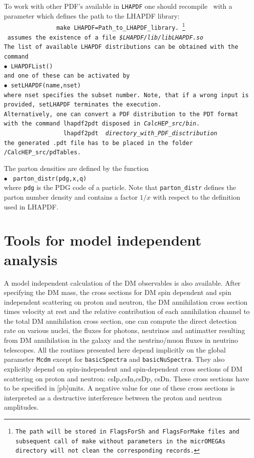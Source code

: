 \documentclass[12pt,a4paper]{article}
\begin{document}
To work with other PDF's available in {\tt LHAPDF}  one should 
 recompile \micro\ with a parameter which defines the  path to the LHAPDF library:\\
\verb|               make LHAPDF=|{\tt Path\_to\_LHAPDF\_library. \footnote{The path will be stored in {\tt FlagsForSh} and 
{\tt FlagsForMake} files and subsequent call of {\tt make} without parameters  in the {\tt micrOMEGAs} directory  will not clean the corresponding records.  } \\
\micro\ assumes the existence of a file {\it  \$LHAPDF/lib/libLHAPDF.so}\\
The list of available LHAPDF
distributions can be obtained with the command\\
$\bullet$ \verb|LHAPDFList()|\\
and one of these can be activated by \\
$\bullet$ \verb|setLHAPDF(name,nset)|\\
where {\tt nset} specifies the subset number. Note, that if a wrong input is provided, 
\verb|setLHAPDF| terminates the execution.\\[2mm]
%
Alternatively, one can convert a  PDF distribution to the PDT format with  the command {\tt  lhapdf2pdt} disposed in {\it CalcHEP\_src/bin}.\\
\verb|                 lhapdf2pdt | {\it directory\_with\_PDF\_disctribution} \\
the generated {\tt .pdt} file has to be placed in the folder {\tt /CalcHEP\_src/pdTables}.
}    

The parton densities are  defined  by the function \\
$\bullet$ \verb| parton_distr(pdg,x,q)|\\
where {\tt pdg} is the PDG code of a particle. Note that \verb|parton_distr| defines the parton number density and  
contains a factor $1/x$  with respect to the  definition used in LHAPDF.  

 
\section{Tools for model independent analysis}
\label{mdlIndep}

A model independent calculation of the DM observables is also available.
After specifying the DM mass, the cross sections for DM  spin dependent and  spin independent scattering on proton and neutron, the DM annihilation cross section times velocity at rest and the relative contribution of  each annihilation channel to the total DM annihilation cross section, one can compute the direct detection rate on   various nuclei, the fluxes for photons, neutrinos and antimatter resulting from DM annihilation in the galaxy and the neutrino/muon fluxes in neutrino telescopes.  
All the routines presented here 
depend implicitly on the  global parameter {\tt Mcdm} except for {\tt basicSpectra} and {\tt basicNuSpectra}.
They also explicitly depend on spin-independent and spin-dependent cross sections of DM scattering
on proton and neutron: csIp,csIn,csDp, csDn. These cross sections have to be specified in
[pb]units. A negative value for one of these cross sections is interpreted as a destructive 
interference between the proton and neutron amplitudes. 
\end{document}
